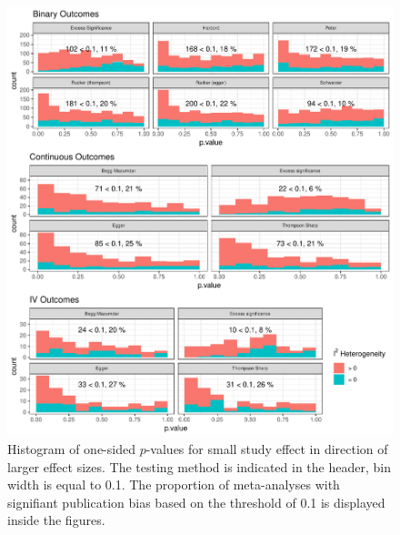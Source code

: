 \documentclass[11pt,a4paper,twoside]{book}\usepackage[]{graphicx}\usepackage[]{color}
\newenvironment{knitrout}{}{} %
\begin{document}
\begin{figure}
\begin{knitrout}
\color{fgcolor}

{\centering \includegraphics[width=\textwidth-3cm]{figure/ch03_figunnamed-chunk-14-1} 

}



\end{knitrout}
\caption{Histogram of one-sided $p$-values for small study effect in direction of larger effect sizes. The testing method is indicated in the header, bin width is equal to 0.1. The proportion of meta-analyses with signifiant publication bias based on the threshold of 0.1 is displayed inside the figures.}
\label{fig:test}
\end{figure}
\end{document}
